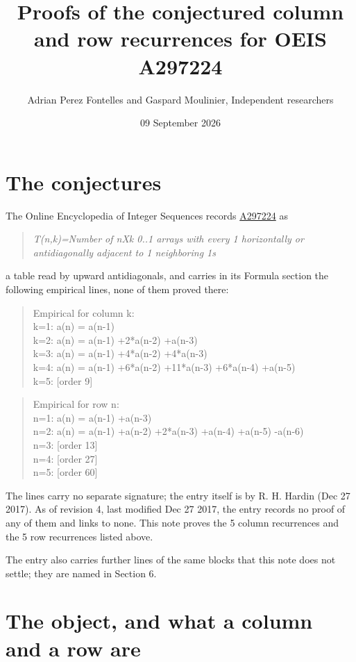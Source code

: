 \documentclass[11pt]{article}
\title{Proofs of the conjectured column and row recurrences for OEIS A297224}
\author{Adrian Perez Fontelles and Gaspard Moulinier, Independent researchers}
\date{09 September 2026}
\theoremstyle{definition}
\begin{document}
\maketitle
\section{The conjectures}

The Online Encyclopedia of Integer Sequences records \href{https://oeis.org/A297224}{A297224} as

\begin{quote}\itshape T(n,k)=Number of nXk 0..1 arrays with every 1 horizontally or antidiagonally adjacent to 1 neighboring 1s\end{quote}

a table read by upward antidiagonals, and carries in its Formula section the following empirical lines, none of them proved there:

\begin{quote}\ttfamily Empirical for column k:\\
k=1: a(n) = a(n-1)\\k=2: a(n) = a(n-1) +2*a(n-2) +a(n-3)\\k=3: a(n) = a(n-1) +4*a(n-2) +4*a(n-3)\\k=4: a(n) = a(n-1) +6*a(n-2) +11*a(n-3) +6*a(n-4) +a(n-5)\\k=5: [order 9]\end{quote}

\begin{quote}\ttfamily Empirical for row n:\\
n=1: a(n) = a(n-1) +a(n-3)\\n=2: a(n) = a(n-1) +a(n-2) +2*a(n-3) +a(n-4) +a(n-5) -a(n-6)\\n=3: [order 13]\\n=4: [order 27]\\n=5: [order 60]\end{quote}

The lines carry no separate signature; the entry itself is by R. H. Hardin (Dec 27 2017). As of revision 4, last modified Dec 27 2017, the entry records no proof of any of them and links to none. This note proves the 5 column recurrences and the 5 row recurrences listed above.

The entry also carries further lines of the same blocks that this note does not settle; they are named in Section 6.

\section{The object, and what a column and a row are}
\end{document}
